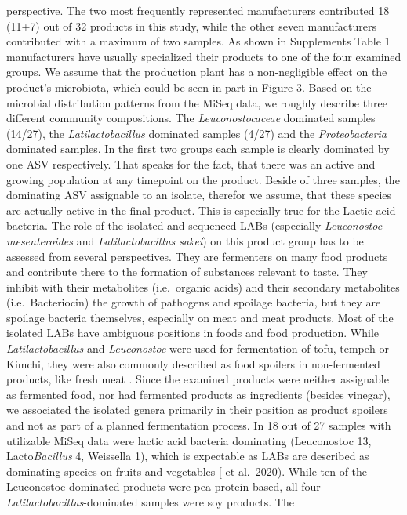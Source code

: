 \documentclass[preprint, 3p,
authoryear]{elsarticle} %
\begin{document}
perspective. The two most frequently represented manufacturers
contributed 18 (11+7) out of 32 products in this study, while the other
seven manufacturers contributed with a maximum of two samples. As shown
in Supplements Table 1 manufacturers have usually specialized their
products to one of the four examined groups. We assume that the
production plant has a non-negligible effect on the product's
microbiota, which could be seen in part in Figure 3. Based on the
microbial distribution patterns from the MiSeq data, we roughly describe
three different community compositions. The \emph{Leuconostocaceae}
dominated samples (14/27), the \emph{Latilactobacillus} dominated
samples (4/27) and the \emph{Proteobacteria} dominated samples. In the
first two groups each sample is clearly dominated by one ASV
respectively. That speaks for the fact, that there was an active and
growing population at any timepoint on the product. Beside of three
samples, the dominating ASV assignable to an isolate, therefor we
assume, that these species are actually active in the final product.
This is especially true for the Lactic acid bacteria. The role of the
isolated and sequenced LABs (especially \emph{Leuconostoc mesenteroides}
and \emph{Latilactobacillus sakei}) on this product group has to be
assessed from several perspectives. They are fermenters on many food
products and contribute there to the formation of substances relevant to
taste. They inhibit with their metabolites (i.e.~organic acids) and
their secondary metabolites (i.e.~Bacteriocin) the growth of pathogens
and spoilage bacteria, but they are spoilage bacteria themselves,
especially on meat and meat products. Most of the isolated LABs have
ambiguous positions in foods and food production. While
\emph{Latilactobacillus} and \emph{Leuconostoc} were used for
fermentation of tofu, tempeh or Kimchi, they were also commonly
described as food spoilers in non-fermented products, like fresh meat
\citep{Casaburi.2015}. Since the examined products were neither
assignable as fermented food, nor had fermented products as ingredients
(besides vinegar), we associated the isolated genera primarily in their
position as product spoilers and not as part of a planned fermentation
process. In 18 out of 27 samples with utilizable MiSeq data were lactic
acid bacteria dominating (Leuconostoc 13, Lacto\emph{Bacillus} 4,
Weissella 1), which is expectable as LABs are described as dominating
species on fruits and vegetables {[}\citet{Yu} et al.~2020). While ten
of the Leuconostoc dominated products were pea protein based, all four
\emph{Latilactobacillus}-dominated samples were soy products. The
\end{document}
